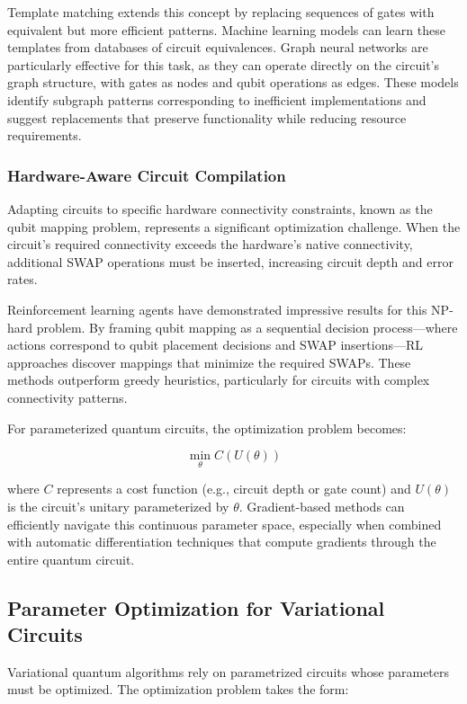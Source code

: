 Template matching extends this concept by replacing sequences of gates with equivalent but more efficient patterns. Machine learning models can learn these templates from databases of circuit equivalences. Graph neural networks are particularly effective for this task, as they can operate directly on the circuit's graph structure, with gates as nodes and qubit operations as edges. These models identify subgraph patterns corresponding to inefficient implementations and suggest replacements that preserve functionality while reducing resource requirements.

\subsubsection{Hardware-Aware Circuit Compilation}

Adapting circuits to specific hardware connectivity constraints, known as the qubit mapping problem, represents a significant optimization challenge. When the circuit's required connectivity exceeds the hardware's native connectivity, additional SWAP operations must be inserted, increasing circuit depth and error rates.

Reinforcement learning agents have demonstrated impressive results for this NP-hard problem. By framing qubit mapping as a sequential decision process—where actions correspond to qubit placement decisions and SWAP insertions—RL approaches discover mappings that minimize the required SWAPs. These methods outperform greedy heuristics, particularly for circuits with complex connectivity patterns.

For parameterized quantum circuits, the optimization problem becomes:

\begin{equation}
\min_{\theta} C(U(\theta))
\end{equation}

where $C$ represents a cost function (e.g., circuit depth or gate count) and $U(\theta)$ is the circuit's unitary parameterized by $\theta$. Gradient-based methods can efficiently navigate this continuous parameter space, especially when combined with automatic differentiation techniques that compute gradients through the entire quantum circuit.

\subsection{Parameter Optimization for Variational Circuits}

Variational quantum algorithms rely on parametrized circuits whose parameters must be optimized. The optimization problem takes the form:

